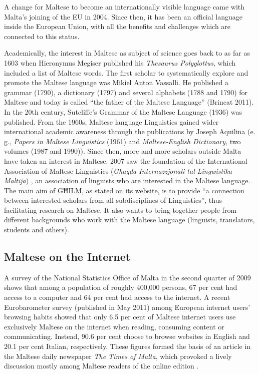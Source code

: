 \documentclass[]{../../metanetpaper}
\begin{document}
\begin{multicols}{2}
A change for Maltese to become an internationally visible language came with Malta's joining of the EU in 2004. Since then, it has been an official language inside the European Union, with all the benefits and challenges which are connected to this status.

Academically, the interest in Maltese as subject of science goes back to as far as 1603 when Hieronymus Megiser published his \emph{Thesaurus Polyglottus}, which included a list of Maltese words. The first scholar to systematically explore and promote the Maltese language was Mikiel Anton Vassalli. He published a grammar (1790), a dictionary (1797) and several alphabets (1788 and 1790) for Maltese and today is called ``the father of the Maltese Language'' (Brincat 2011). In the 20th century, Sutcliffe's Grammar of the Maltese Language (1936) was published. From the 1960s, Maltese language Linguistics gained wider international academic awareness through the publications by Joseph Aquilina (e.\,g., \emph{Papers in Maltese Linguistics} (1961) and \emph{Maltese-English Dictionary}, two volumes (1987 and 1990)). Since then, more and more scholars outside Malta have taken an interest in Maltese. 2007 saw the foundation of the International Association of Maltese Linguistics (\emph{Għaqda Internazzjonali tal-Lingwistika Maltija}) \cite{GHILM2}, an association of linguists who are interested in the Maltese language. The main aim of GĦILM, as stated on its website, is to provide ``a connection between interested scholars from all subdisciplines of Linguistics'', thus facilitating research on Maltese. It also wants to bring together people from different backgrounds who work with the Maltese language (linguists, translators, students and others).


\subsection{Maltese on the Internet}

A survey of the National Statistics Office of Malta in the second quarter of 2009 \cite{NSO2} shows that among a population of roughly 400,000 persons, 67 per cent had access to a computer and 64 per cent had access to the internet. A recent Eurobarometer survey (published in May 2011) \cite{Eurobarometer1} among European internet users' browsing habits showed that only 6.5 per cent of Maltese internet users use exclusively Maltese on the internet when reading, consuming content or communicating. Instead, 90.6 per cent choose to browse websites in English and 20.1 per cent Italian, respectively. These figures formed the basis of an article in the Maltese daily newspaper \emph{The Times of Malta}, which provoked a lively discussion mostly among Maltese readers of the online edition \cite{TimesOfMalta1}. 


\end{multicols}
\end{document}
